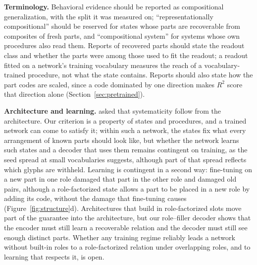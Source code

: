\documentclass[10pt]{article}
\theoremstyle{plain}
\theoremstyle{remark}
\begin{document}
\textbf{Terminology.} Behavioral evidence should be reported as compositional generalization, with the split it was measured on; ``representationally compositional'' should be reserved for states whose parts are recoverable from composites of fresh parts, and ``compositional system'' for systems whose own procedures also read them. Reports of recovered parts should state the readout class and whether the parts were among those used to fit the readout; a readout fitted on a network's training vocabulary measures the reach of a vocabulary-trained procedure, not what the state contains. Reports should also state how the part codes are scaled, since a code dominated by one direction makes $R^2$ score that direction alone (Section~\ref{sec:pretrained}).

\textbf{Architecture and learning.} \citet{fodor1990} asked that systematicity follow from the architecture. Our criterion is a property of states and procedures, and a trained network can come to satisfy it; within such a network, the states fix what every arrangement of known parts should look like, but whether the network learns such states and a decoder that uses them remains contingent on training, as the seed spread at small vocabularies suggests, although part of that spread reflects which glyphs are withheld. Learning is contingent in a second way: fine-tuning on a new part in one role damaged that part in the other role and damaged old pairs, although a role-factorized state allows a part to be placed in a new role by adding its code, without the damage that fine-tuning causes (Figure~\ref{fig:structure}d). Architectures that build in role-factorized slots move part of the guarantee into the architecture, but our role--filler decoder shows that the encoder must still learn a recoverable relation and the decoder must still see enough distinct parts. Whether any training regime reliably leads a network without built-in roles to a role-factorized relation under overlapping roles, and to learning that respects it, is open.
\end{document}
